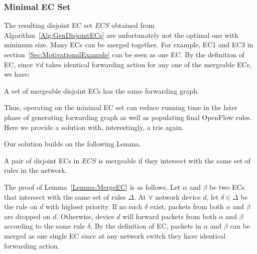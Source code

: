 \subsubsection{Minimal EC Set}
The resulting disjoint EC set $ECS$ obtained from Algorithm~\ref{Alg:GenDisjointECs} are unfortunately not the optimal one with minimum size.
Many ECs can be merged together.
For example, EC1 and EC3 in section~\ref{Sec:MotivationalExample} can be seen as one EC.
By the definition of EC, since $\forall d$ takes identical forwarding action for any one of
the mergeable ECs, we have:
\begin{lemma}
A set of mergeable disjoint ECs has the same forwarding graph.
\label{Lemma:MergeFG}
\end{lemma}
Thus, operating on the minimal EC set can reduce running time in the later phase of
generating forwarding graph as well as populating final OpenFlow rules.
Here we provide a solution with, interestingly, a trie again.

Our solution builds on the following Lemma.
\begin{lemma}
A pair of disjoint ECs in $ECS$ is mergeable if they intersect with the
same set of rules in the network.
\label{Lemma:MergeEC}
\end{lemma}
The proof of Lemma~\ref{Lemma:MergeEC} is as follows.
Let $\alpha$ and $\beta$ be two ECs that intersect with the same set of rules $\Delta$.
At $\forall$ network device $d$, let $\delta \in \Delta$ be the rule on $d$ with
highest priority.
If no such $\delta$ exist, packets from both $\alpha$ and $\beta$ are dropped on $d$.
Otherwise, device $d$ will forward packets from both $\alpha$ and $\beta$ according to the same
rule $\delta$.
By the definition of EC, packets in $\alpha$ and $\beta$ can be merged as one single EC
since at any network switch they have identical forwarding action.

